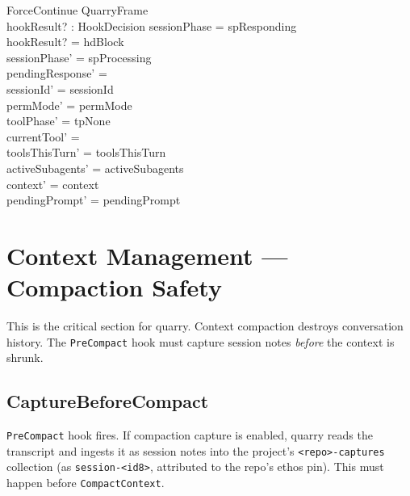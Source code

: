 \documentclass[a4paper,10pt,fleqn]{article}
\begin{document}
\begin{schema}{ForceContinue}
  QuarryFrame \\
  hookResult? : HookDecision
  \where
  sessionPhase = spResponding \\
  hookResult? = hdBlock \\
  sessionPhase' = spProcessing \\
  pendingResponse' = \emptyset \\
  sessionId' = sessionId \\
  permMode' = permMode \\
  toolPhase' = tpNone \\
  currentTool' = \emptyset \\
  toolsThisTurn' = toolsThisTurn \\
  activeSubagents' = activeSubagents \\
  context' = context \\
  pendingPrompt' = pendingPrompt
\end{schema}

\section{Context Management --- Compaction Safety}

This is the critical section for quarry. Context compaction destroys
conversation history. The \texttt{PreCompact} hook must capture
session notes \emph{before} the context is shrunk.

\subsection{CaptureBeforeCompact}

\texttt{PreCompact} hook fires. If compaction capture is enabled,
quarry reads the transcript and ingests it as session notes into
the project's \texttt{<repo>-captures} collection (as
\texttt{session-<id8>}, attributed to the repo's ethos pin). This
must happen before \texttt{CompactContext}.
\end{document}
